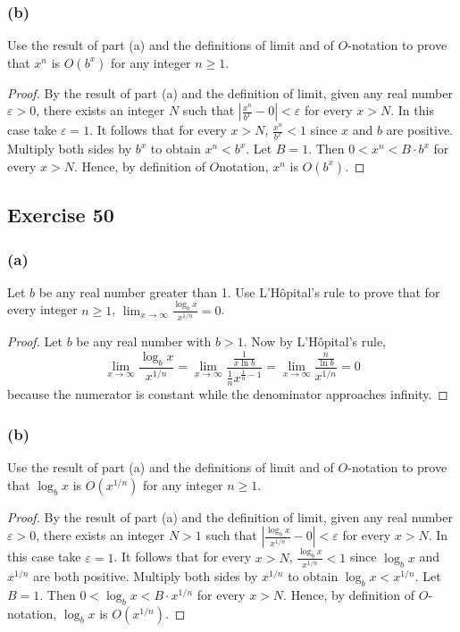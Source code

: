 \documentclass[14pt]{extarticle}
\newcommand{\dps}{\displaystyle}
\newcommand{\eps}{\varepsilon}
\begin{document}
\subsubsection{(b)}
Use the result of part (a) and the definitions of limit and of \(O\)-notation to prove that \(x^n\) is \(O(b^x)\) for any
integer \(n \geq 1\).

\begin{proof}
    By the result of part (a) and the definition of limit, given any real number \(\eps > 0\), there exists an integer \(N\)
    such that \(\dps \left|\frac{x^n}{b^x} - 0\right| < \eps\) for every \(x > N\). In this case take \(\eps = 1\). It follows
    that for every \(x > N\), \(\dps \frac{x^n}{b^x} < 1\) since \(x\) and \(b\) are positive. Multiply both sides by \(b^x\) to
    obtain \(x^n < b^x\). Let \(B = 1\). Then \(0 < x^n < B \cdot b^x\) for every \(x > N\).
    Hence, by definition of \(O\)notation, \(x^n\) is \(O(b^x)\).
\end{proof}

\subsection{Exercise 50}
\subsubsection{(a)}
Let \(b\) be any real number greater than 1. Use L’Hôpital’s rule to prove that for every integer \(n \geq 1\),
\(\dps \lim_{x \to \infty}\frac{\log_b x}{x^{1/n}} = 0\).

\begin{proof}
    Let \(b\) be any real number with \(b > 1\). Now by L’Hôpital’s rule,
    \[
        \lim_{x \to \infty} \frac{\log_b x}{x^{1/n}} = \lim_{x \to \infty} \frac{\frac{1}{x \ln b}}{\frac{1}{n}x^{\frac{1}{n}-1}}
        = \lim_{x \to \infty} \frac{\frac{n}{\ln b}}{x^{1/n}} = 0
    \]
    because the numerator is constant while the denominator approaches infinity.
\end{proof}

\subsubsection{(b)}
Use the result of part (a) and the definitions of limit and of \(O\)-notation to prove that \(\log_b x\) is \(O(x^{1/n})\)
for any integer \(n \geq 1\).

\begin{proof}
    By the result of part (a) and the definition of limit, given any real number \(\eps > 0\), there exists an integer \(N>1\)
    such that \(\dps \left|\frac{\log_b x}{x^{1/n}} - 0\right| < \eps\) for every \(x > N\). In this case take \(\eps = 1\). It
    follows that for every \(x > N\), \(\dps \frac{\log_b x}{x^{1/n}} < 1\) since \(\log_b x\) and \(x^{1/n}\) are both
    positive. Multiply both sides by \(x^{1/n}\) to obtain \(\log_b x < x^{1/n}\). Let \(B = 1\). Then \(0 < \log_b x < B
    \cdot x^{1/n}\) for every \(x > N\). Hence, by definition of \(O\)-notation, \(\log_b x\) is \(O(x^{1/n})\).
\end{proof}
\end{document}
